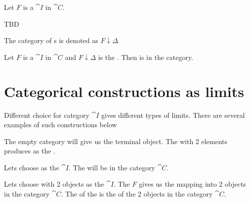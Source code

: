 \begin{definition}
\label{def:category_of_cocones}
Let $F$ is a  $\cat{I}$ in $\cat{C}$.

TBD

The category of s is denoted as $F \downarrow
\Delta$ \cite{wiki:cone}  
\end{definition}


\begin{remark}
\label{rem:category_of_cocones}
Let $F$ is a  $\cat{I}$ in $\cat{C}$
and $F \downarrow \Delta$ is the .
Then  is  in the
category. 
\end{remark}

\section{Categorical constructions as limits}

Different choice for category $\cat{I}$ gives different types of
limits. There are several examples of such constructions below

The empty category will give us the terminal object. The
 with 2 elements produces
 as the .

\begin{example}
Lets choose  as the
 $\cat{I}$. The 
will be  in the category $\cat{C}$.
\end{example}

\begin{example}[Limit][Product]
Lets choose  with 2 objects as the
 $\cat{I}$. The 
 $F$ gives us the mapping into 2
objects in the category $\cat{C}$. The  of the
 is the  of the
2 objects in the category $\cat{C}$.
\end{example}
